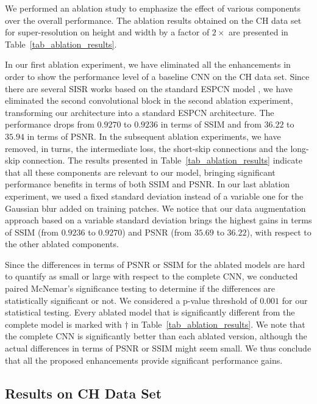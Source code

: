 \documentclass{ieeeaccess}
\begin{document}
We performed an ablation study to emphasize the effect of various components over the overall performance. The ablation results obtained on the CH data set for super-resolution on height and width by a factor of $2\times$ are presented in Table~\ref{tab_ablation_results}.

In our first ablation experiment, we have eliminated all the enhancements in order to show the performance level of a baseline CNN on the CH data set. Since there are several SISR works \cite{Du-AS-2019, Hatvani-TRPMS-2018, Yu-ICIP-2017, Zhao-TMI-2019} based on the standard ESPCN model \cite{Shi-CVPR-2016}, we have eliminated the second convolutional block in the second ablation experiment, transforming our architecture into a standard ESPCN architecture. The performance drops from $0.9270$ to $0.9236$ in terms of SSIM and from $36.22$ to $35.94$ in terms of PSNR. In the subsequent ablation experiments, we have removed, in turns, the intermediate loss, the short-skip connections and the long-skip connection. The results presented in Table~\ref{tab_ablation_results} indicate that all these components are relevant to our model, bringing significant performance benefits in terms of both SSIM and PSNR. In our last ablation experiment, we used a fixed standard deviation instead of a variable one for the Gaussian blur added on training patches. We notice that our data augmentation approach based on a variable standard deviation brings the highest gains in terms of SSIM (from $0.9236$ to $0.9270$) and PSNR (from $35.69$ to $36.22$), with respect to the other ablated components. 

Since the differences in terms of PSNR or SSIM for the ablated models are hard to quantify as small or large with respect to the complete CNN, we conducted paired McNemar's significance testing \cite{Dietterich-NC-1998} to determine if the differences are statistically significant or not. We considered a p-value threshold of $0.001$ for our statistical testing. Every ablated model that is significantly different from the complete model is marked with $\dagger$ in Table~\ref{tab_ablation_results}. We note that the complete CNN is significantly better than each ablated version, although the actual differences in terms of PSNR or SSIM might seem small. We thus conclude that all the proposed enhancements provide significant performance gains.

\subsection{Results on CH Data Set}
\end{document}
